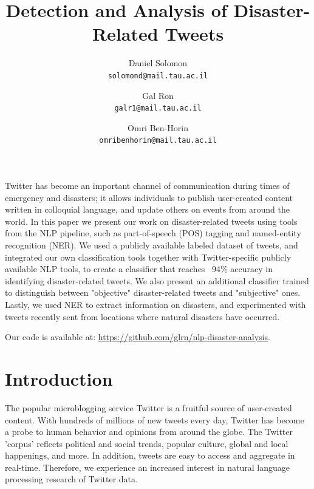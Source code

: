\documentclass[letterpaper,twocolumn,10pt]{article}
\begin{document}
\date{}

\title{\Large \bf Detection and Analysis of Disaster-Related Tweets}

\author{
{\rm Daniel Solomon}\\
\normalsize{\texttt{solomond@mail.tau.ac.il}}
\and
{\rm Gal Ron}\\
\normalsize{\texttt{galr1@mail.tau.ac.il‬}}
\and
{\rm Omri Ben-Horin}\\
\normalsize{\texttt{omribenhorin@mail.tau.ac.il}}
}

\maketitle

\thispagestyle{empty}


\abstract{}

\paragraph{}
\begin{center}
	\parbox{200pt}{
		Twitter has become an important channel of communication during times of emergency and disasters; it allows individuals to publish user-created content written in colloquial language, and update others on events from around the world.
		In this paper we present our work on disaster-related tweets using tools from the NLP pipeline, such as part-of-speech (POS) tagging and named-entity recognition (NER). We used a publicly available labeled dataset of tweets, and integrated our own classification tools together with Twitter-specific publicly available NLP tools, to create a classifier that reaches ~94\% accuracy in identifying disaster-related tweets. We also present an additional classifier trained to distinguish between "objective" disaster-related tweets and "subjective" ones. Lastly, we used NER to extract information on disasters, and experimented with  tweets recently sent from locations where natural disasters have occurred.
	
		Our code is available at: \url{https://github.com/glrn/nlp-disaster-analysis}.
	}
\end{center}

\section{Introduction}
The popular microblogging service Twitter is a fruitful source of user-created content. With hundreds of millions of new tweets every day, Twitter has become a probe to human behavior and opinions from around the globe. The Twitter 'corpus' reflects political and social trends, popular culture, global and local happenings, and more. In addition, tweets are easy to access and aggregate in real-time. Therefore, we experience an increased interest in natural language processing research of Twitter data.
\end{document}
